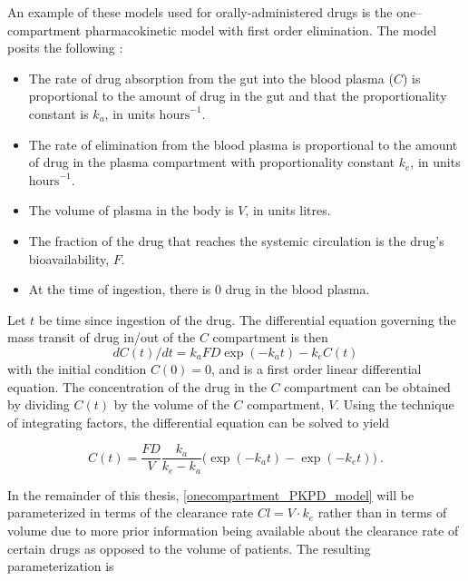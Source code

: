 An example of these models used for orally-administered drugs is the one--compartment pharmacokinetic model with first order elimination.  The model posits the following \cite{wakefield1992bayesian}:  
%
\begin{itemize}
\item The rate of drug absorption from the gut  into the blood plasma ($ C $) is proportional to the amount of drug in the gut and that the proportionality constant is $ k_a $, in units $ \text{hours}^{-1} $.

\item The rate of elimination from the blood plasma is proportional to the amount of drug in the plasma compartment with proportionality constant $ k_e $, in units $ \text{hours}^{-1} $.

\item The volume of plasma in the body is $ V $, in units litres.

\item The fraction of the drug that reaches the systemic circulation is the drug’s bioavailability, $F$.

\item At the time of ingestion, there is 0 drug in the blood plasma.
\end{itemize}

Let $t$ be time since ingestion of the drug.  The differential equation governing the mass transit of drug in/out of the $C$ compartment is then 
\begin{equation}  \label{pkpd_ode}
dC(t)/dt = k_aFD\exp(-k_a t) - k_eC(t) 
\end{equation}
\noindent with the initial condition $C(0) = 0$, and is a first order linear differential equation.  The concentration of the drug in the $C$ compartment can be obtained by dividing $C(t)$ by the volume of the $C$ compartment, $V$.  Using the technique of integrating factors, the differential equation can be solved to yield

\begin{equation}\label{onecompartment_PKPD_model}
	C(t) = \dfrac{F D}{V}\dfrac{k_a}{k_e - k_a}\Big(\exp(-k_at) - \exp(-k_et)\Big) \>.
\end{equation}

In the remainder of this thesis, \cref{onecompartment_PKPD_model} will be parameterized in terms of the clearance rate $Cl = V \cdot k_e$ rather than in terms of volume due to more prior information being available about the clearance rate of certain drugs as opposed to the volume of patients.  The resulting parameterization is

